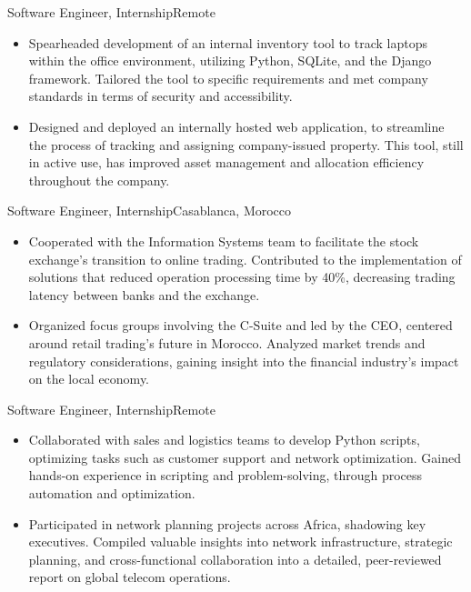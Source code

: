 \documentclass[letterpaper,10.5pt]{article}
\begin{document}
{Software Engineer, Internship}{Remote}
\begin{itemize}
    \item Spearheaded development of an internal inventory tool to track laptops within the office environment, utilizing Python, SQLite, and the Django framework. Tailored the tool to specific requirements and met company standards in terms of security and accessibility.
    
    \item Designed and deployed an internally hosted web application, to streamline the process of tracking and assigning company-issued property. This tool, still in active use, has improved asset management and allocation efficiency throughout the company.
\end{itemize}

{Software Engineer, Internship}{Casablanca, Morocco}
\begin{itemize}
    \item Cooperated with the Information Systems team to facilitate the stock exchange’s transition to online trading. Contributed to the implementation of solutions that reduced operation processing time by 40\%, decreasing trading latency between banks and the exchange.
    
    \item Organized focus groups involving the C-Suite and led by the CEO, centered around retail trading's future in Morocco. Analyzed market trends and regulatory considerations, gaining insight into the financial industry's impact on the local economy.
\end{itemize}
{Software Engineer, Internship}{Remote}
\begin{itemize}
    \item Collaborated with sales and logistics teams to develop Python scripts, optimizing tasks such as customer support and network optimization. Gained hands-on experience in scripting and problem-solving, through process automation and optimization.
    
    \item Participated in network planning projects across Africa, shadowing key executives. Compiled valuable insights into network infrastructure, strategic planning, and cross-functional collaboration into a detailed, peer-reviewed report on global telecom operations.

\end{itemize}
\end{document}
